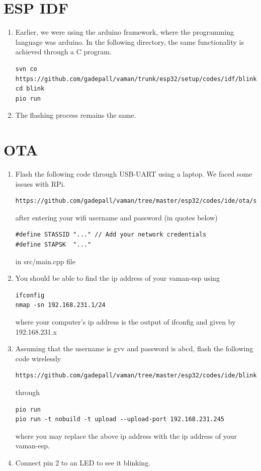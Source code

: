 \section{ESP IDF}
\renewcommand{\theequation}{\theenumi}
\renewcommand{\thefigure}{\theenumi}
\begin{enumerate}[label=\thesection.\arabic*.,ref=\thesection.\theenumi]
\item Earlier, we were using the arduino framework, where the programming language was arduino.  In the following directory, the same functionality is achieved through a C program.
\begin{lstlisting}
svn co https://github.com/gadepall/vaman/trunk/esp32/setup/codes/idf/blink
cd blink
pio run
\end{lstlisting}
\item The flashing process remains the same.
\end{enumerate}
\section{OTA}
\renewcommand{\theequation}{\theenumi}
\renewcommand{\thefigure}{\theenumi}
\begin{enumerate}[label=\thesection.\arabic*.,ref=\thesection.\theenumi]
\item Flash the following code through USB-UART using a laptop.  We faced some issues with RPi.
\begin{lstlisting}
https://github.com/gadepall/vaman/tree/master/esp32/codes/ide/ota/setup
\end{lstlisting}
		after entering your wifi username and password (in quotes below)
\begin{lstlisting}
#define STASSID "..." // Add your network credentials
#define STAPSK  "..."
\end{lstlisting}
in src/main.cpp file
\item You should be able to find the ip address of your vaman-esp using 
\begin{lstlisting}
ifconfig
nmap -sn 192.168.231.1/24
\end{lstlisting}
where your computer's ip address is the output of ifconfig and given by 192.168.231.x
\item Assuming that the username is gvv and password is abcd, flash the following code wirelessly
\begin{lstlisting}
https://github.com/gadepall/vaman/tree/master/esp32/codes/ide/blink
\end{lstlisting}
through 
\begin{lstlisting}
pio run 
pio run -t nobuild -t upload --upload-port 192.168.231.245
\end{lstlisting}
where you may replace the above ip address with the ip address of your vaman-esp.
\item Connect pin 2 to an LED  to see it blinking.


\end{enumerate}
	\fi

